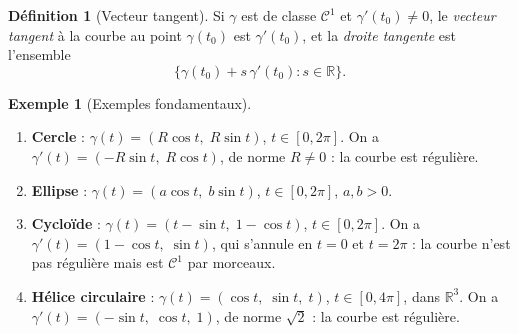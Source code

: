 \documentclass[12pt,a4paper,openany]{book}
\theoremstyle{definition}
\newtheorem{definition}{Définition}[chapter]
\newtheorem{exemple}{Exemple}[chapter]
\newcommand{\R}{\mathbb{R}}
\begin{document}
\begin{definition}[Vecteur tangent]\label{def:vecteur-tangent}
  Si $\gamma$ est de classe $\mathcal{C}^1$ et $\gamma'(t_0) \neq 0$,
  le \emph{vecteur tangent} à la courbe au point $\gamma(t_0)$ est
  $\gamma'(t_0)$, et la \emph{droite tangente} est
  l'ensemble
  \[
    \bigl\{\gamma(t_0) + s\,\gamma'(t_0) : s \in \R\bigr\}.
  \]
\end{definition}

\begin{center}
\end{center}


\begin{exemple}[Exemples fondamentaux]\label{ex:courbes-classiques}
  \begin{enumerate}[label=\textup{(\roman*)}]
    \item \textbf{Cercle} :
      $\gamma(t) = (R\cos t,\; R\sin t)$, $t \in [0, 2\pi]$. On a
      $\gamma'(t) = (-R\sin t,\; R\cos t)$, de norme $R \neq 0$ :
      la courbe est régulière.
    \item \textbf{Ellipse} :
      $\gamma(t) = (a\cos t,\; b\sin t)$, $t \in [0, 2\pi]$,
      $a, b > 0$.
    \item \textbf{Cycloïde} :
      $\gamma(t) = (t - \sin t,\; 1 - \cos t)$, $t \in [0, 2\pi]$.
      On a $\gamma'(t) = (1-\cos t,\; \sin t)$, qui s'annule en
      $t = 0$ et $t = 2\pi$ : la courbe n'est pas régulière mais est
      $\mathcal{C}^1$ par morceaux.
    \item \textbf{Hélice circulaire} :
      $\gamma(t) = (\cos t,\; \sin t,\; t)$, $t \in [0, 4\pi]$, dans
      $\R^3$. On a $\gamma'(t) = (-\sin t,\; \cos t,\; 1)$, de norme
      $\sqrt{2}$ : la courbe est régulière.
  \end{enumerate}
\end{exemple}
\end{document}
